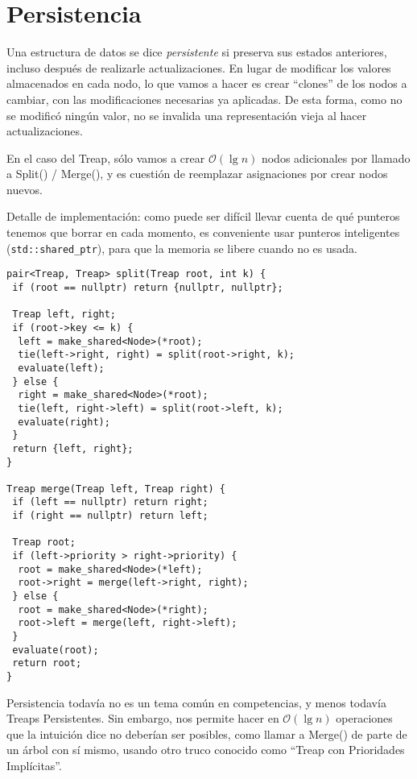 \section{Persistencia}
\label{sec:persistencia}

Una estructura de datos se dice \textit{persistente} si preserva sus estados anteriores, incluso después de realizarle actualizaciones.
En lugar de modificar los valores almacenados en cada nodo, lo que vamos a hacer es crear ``clones'' de los nodos a cambiar, con las modificaciones necesarias ya aplicadas.
De esta forma, como no se modificó ningún valor, no se invalida una representación vieja al hacer actualizaciones.

En el caso del Treap, sólo vamos a crear \(\mathcal{O}(\lg n)\) nodos adicionales por llamado a Split() / Merge(), y es cuestión de reemplazar asignaciones por crear nodos nuevos.

Detalle de implementación: como puede ser difícil llevar cuenta de qué punteros tenemos que borrar en cada momento,
es conveniente usar punteros inteligentes (\texttt{std::shared\_ptr}), para que la memoria se libere cuando no es usada.

\begin{verbatim}
pair<Treap, Treap> split(Treap root, int k) {
 if (root == nullptr) return {nullptr, nullptr};

 Treap left, right;
 if (root->key <= k) {
  left = make_shared<Node>(*root);
  tie(left->right, right) = split(root->right, k);
  evaluate(left);
 } else {
  right = make_shared<Node>(*root);
  tie(left, right->left) = split(root->left, k);
  evaluate(right);
 }
 return {left, right};
}

Treap merge(Treap left, Treap right) {
 if (left == nullptr) return right;
 if (right == nullptr) return left;

 Treap root;
 if (left->priority > right->priority) {
  root = make_shared<Node>(*left);
  root->right = merge(left->right, right);
 } else {
  root = make_shared<Node>(*right);
  root->left = merge(left, right->left);
 }
 evaluate(root);
 return root;
}
\end{verbatim}

Persistencia todavía no es un tema común en competencias, y menos todavía Treaps Persistentes.
Sin embargo, nos permite hacer en \(\mathcal{O}(\lg n)\) operaciones que la intuición dice no deberían ser posibles, como llamar a Merge() de parte de un árbol con sí mismo,
usando otro truco conocido como ``Treap con Prioridades Implícitas''.


